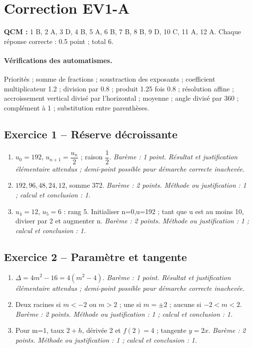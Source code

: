 \mxnewpage\section*{Correction EV1-A}\label{EV1-A-CORR}
\textbf{QCM :} 1 B, 2 A, 3 D, 4 B, 5 A, 6 B, 7 B, 8 B, 9 D, 10 C, 11 A, 12 A. Chaque réponse correcte : \num{0,5} point ; total 6.
\paragraph{Vérifications des automatismes.} Priorités ; somme de fractions ; soustraction des exposants ; coefficient multiplicateur \num{1,2} ; division par \num{0,8} ; produit \num{1,25} fois \num{0,8} ; résolution affine ; accroissement vertical divisé par l’horizontal ; moyenne ; angle divisé par 360 ; complément à 1 ; substitution entre parenthèses.
\subsection*{Exercice 1 -- Réserve décroissante}
\begin{enumerate}
\item $u_0=192$, $u_{n+1}=\dfrac{u_n}{2}$ ; raison $\dfrac{1}{2}$. \textit{Barème : 1 point. Résultat et justification élémentaire attendus ; demi-point possible pour démarche correcte inachevée.}
\item $192,96,48,24,12$, somme 372. \textit{Barème : 2 points. Méthode ou justification : 1 ; calcul et conclusion : 1.}
\item $u_4=12$, $u_5=6$ : rang 5. Initialiser n=0,u=192 ; tant que u est au moins 10, diviser par 2 et augmenter n. \textit{Barème : 2 points. Méthode ou justification : 1 ; calcul et conclusion : 1.}
\end{enumerate}
\subsection*{Exercice 2 -- Paramètre et tangente}
\begin{enumerate}
\item $\Delta=4m^2-16=4(m^2-4)$. \textit{Barème : 1 point. Résultat et justification élémentaire attendus ; demi-point possible pour démarche correcte inachevée.}
\item Deux racines si $m<-2$ ou $m>2$ ; une si $m=\pm2$ ; aucune si $-2<m<2$. \textit{Barème : 2 points. Méthode ou justification : 1 ; calcul et conclusion : 1.}
\item Pour m=1, taux $2+h$, dérivée 2 et $f(2)=4$ ; tangente $y=2x$. \textit{Barème : 2 points. Méthode ou justification : 1 ; calcul et conclusion : 1.}
\end{enumerate}
